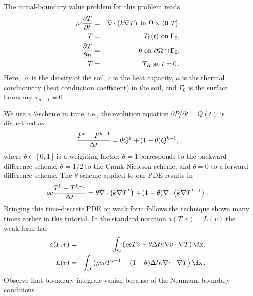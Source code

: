 The initial-boundary value problem for this problem reads
\begin{eqnarray}
\varrho c{\partial T\over\partial t} &=& \nabla\cdot\left( k\nabla T\right)\hbox{ in }\Omega\times (0,T],\\
T &=& T_0(t)\hbox{ on }\Gamma_0,\\
{\partial T\over\partial n} &=& 0\hbox{ on }\partial\Omega\cap\Gamma_0,\\
T &=& T_R\hbox{ at }t =0\thinspace .
\end{eqnarray}
Here, $\varrho$ is the density of the soil, $c$ is the
heat capacity, $\kappa$ is the thermal conductivity
(heat conduction coefficient)
in the soil, and $\Gamma_0$ is the surface boundary $x_{d-1}=0$.

We use a $\theta$-scheme in time, i.e., the evolution equation
$\partial P/\partial t=Q(t)$ is discretized as
\[ {P^k - P^{k-1}\over\Delta t} = \theta Q^k + (1-\theta )Q^{k-1},\]
where $\theta\in[0,1]$ is a weighting factor: $\theta =1$ corresponds
to the backward difference scheme, $\theta =1/2$ to the Crank-Nicolson
scheme, and $\theta =0$ to a forward difference scheme.
The $\theta$-scheme applied to our PDE results in
\[
\varrho c{T^k-T^{k-1}\over\Delta t} =
\theta \nabla\cdot\left( k\nabla T^k\right)
+ (1-\theta) \nabla\cdot\left( k\nabla T^{k-1}\right)\thinspace .
\]
Bringing this time-discrete PDE on weak form follows the technique shown
many times earlier in this tutorial. In the standard notation
$a(T,v)=L(v)$ the weak form has
\begin{eqnarray}
a(T,v) &=& \int_\Omega
\left( \varrho c Tv + \theta\Delta t \kappa\nabla v\cdot\nabla T\right)\dx,\\
L(v) &=& \int_\Omega \left( \varrho c vT^{k-1} - (1-\theta)\Delta t
\kappa\nabla v\cdot\nabla T\right)\dx\langtangenep
\end{eqnarray}
Observe that boundary integrals vanish because of the Neumann boundary
conditions.

